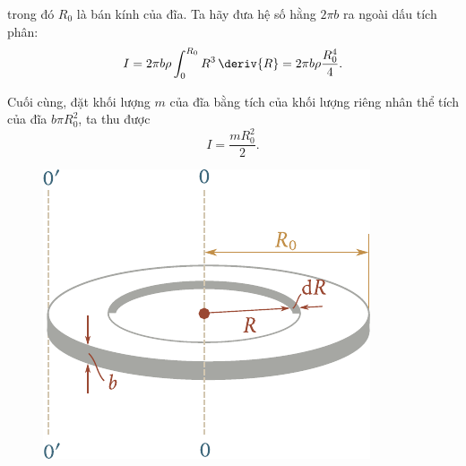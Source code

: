 \noindent
trong đó $R_0$ là bán kính của đĩa. Ta hãy đưa hệ số hằng $2\pi b$ ra ngoài dấu tích phân:
\begin{equation*}
I = 2\pi b\rho \int_0^{R_0} R^3\,\deriv{R} = 2\pi b\rho\frac{R^4_0}{4}.
\end{equation*}

\noindent
Cuối cùng, đặt khối lượng $m$ của đĩa bằng tích của khối lượng riêng nhân thể tích của đĩa $b\pi R_0^2$, ta thu được
\begin{equation}\label{eq:5_22}
I = \frac{mR_0^2}{2}.
\end{equation}

\begin{figure}[!htb]
	\begin{center}
		\includegraphics[scale=0.95]{figures/ch_05/fig_5_11.pdf}
		\caption[]{}
		\label{fig:5_11}
	\end{center}
\end{figure}

